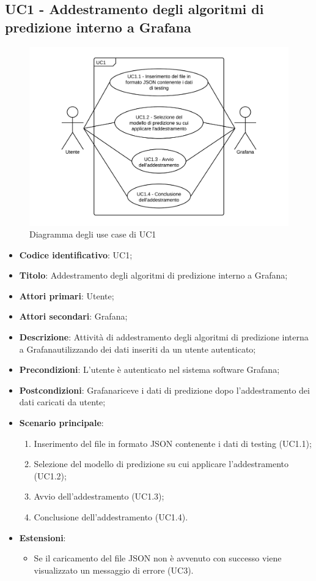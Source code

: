 \subsection{UC1 - Addestramento degli algoritmi di predizione interno a Grafana}
\begin{figure}[H]
\includegraphics{img/UC1_-_Addestramento_degli_algoritmi_di_predizione_interno_a_Grafana.png}
\caption{Diagramma degli use case di UC1}
\end{figure}
\begin{itemize}
	\item \textbf{Codice identificativo}: UC1;
	\item \textbf{Titolo}: Addestramento degli algoritmi di predizione interno a Grafana\glo;
	\item \textbf{Attori primari}: Utente;
	\item \textbf{Attori secondari}: Grafana\glo;
	\item \textbf{Descrizione}: Attività di addestramento degli algoritmi di predizione interna a Grafana\glosp utilizzando dei dati inseriti da un utente autenticato;
	\item \textbf{Precondizioni}: L'utente è autenticato nel sistema software Grafana\glosp;
	\item \textbf{Postcondizioni}: Grafana\glosp riceve i dati di predizione dopo l'addestramento dei dati caricati da utente;
	\item \textbf{Scenario principale}: 
		\begin{enumerate}
			\item Inserimento del file in formato JSON contenente i dati di testing (UC1.1);
			\item Selezione del modello di predizione su cui applicare l'addestramento (UC1.2);
			\item Avvio dell'addestramento (UC1.3);
			\item Conclusione dell'addestramento (UC1.4).
		\end{enumerate}
	\item \textbf{Estensioni}:
	\begin{itemize}
		\item Se il caricamento del file JSON non è avvenuto con successo viene visualizzato un messaggio di errore (UC3).
	\end{itemize}
\end{itemize}

